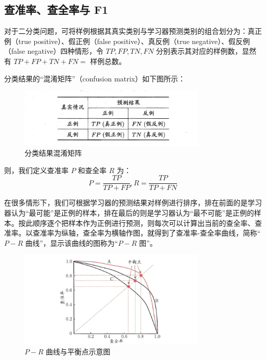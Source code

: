 \documentclass[12pt, a4paper]{article} %
\begin{document}
\subsection{查准率、查全率与 F1}

对于二分类问题，可将样例根据其真实类别与学习器预测类别的组合划分为：真正例（true positive）、假正例（false positive）、真反例（true negative）、假反例（false negative）四种情形，令 $TP, FP, TN, FN$ 分别表示其对应的样例数，显然有 $TP + FP + TN + FN = $ 样例总数。

分类结果的“混淆矩阵”（confusion matrix）如下图所示：

\begin{figure}[H]
    \centering
    \includegraphics[width=0.8\textwidth]{../img/2-2-分类结果混淆矩阵.png}
    \caption{分类结果混淆矩阵}
    \label{fig:分类结果混淆矩阵}
\end{figure}

则，我们定义查准率 $P$ 和查全率 $R$ 为：
\begin{equation*}
    P = \frac{TP}{TP + FP}, R = \frac{TP}{TP + FN}
\end{equation*}

在很多情形下，我们可根据学习器的预测结果对样例进行排序，排在前面的是学习器认为“最可能”是正例的样本，排在最后的则是学习器认为“最不可能”是正例的样本。按此顺序逐个把样本作为正例进行预测，则每次可以计算出当前的查全率、查准率。以查准率为纵轴，查全率为横轴作图，就得到了查准率-查全率曲线，简称“$P-R$ 曲线”，显示该曲线的图称为“$P-R$ 图”。

\begin{figure}[H]
    \centering
    \includegraphics[width=0.8\textwidth]{../img/2-3-P-R曲线与平衡点示意图.png}
    \caption{$P-R$ 曲线与平衡点示意图}
    \label{fig: $P-R$ 曲线与平衡点示意图}
\end{figure}
\end{document}
